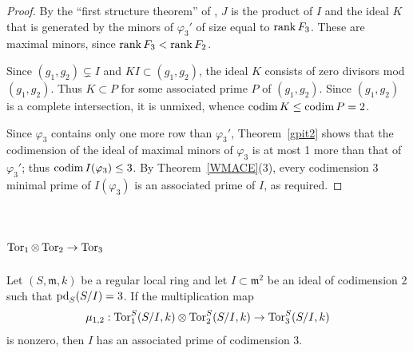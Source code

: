 \documentclass[11pt]{amsart}
\def\phi{{\varphi}}
\def\gm{{\mathfrak m}}
\begin{document}
\begin{proof}
 By the ``first structure theorem'' of \cite[Theorem 3.1]{structure}, $J$ is the product of $I$ and the ideal $K$ that is generated by the
 minors of $\phi_{3}'$ of size equal to $\operatorname{rank} F_{3}$. These are maximal minors, since
 $\operatorname{rank} F_{3}<\operatorname{rank} F_{2}$.

Since $(g_{1}, g_{2})\subsetneq I$ and $KI\subset (g_{1},g_{2})$, the ideal $K$ consists of zero divisors mod $(g_{1},g_{2})$.
Thus $K\subset P$ for some associated prime $P$ of  $(g_{1},g_{2})$. Since $(g_{1},g_{2})$
 is a complete intersection, it is unmixed, whence $\operatorname{codim} K \leq \operatorname{codim} P = 2$.
 
Since $\phi_{3}$ contains only one more row than $\phi_{3}'$, Theorem~\ref{gpit2} shows that the codimension of the ideal of maximal minors of $\phi_{3}$ is at most 1 more than that of $\phi_{3}'$; thus 
$\codim I(\phi_{3})\leq 3$. By Theorem~\ref{WMACE}(3), every codimension 3 minimal prime of $I(\phi_3)$ is an associated prime of $I$, as required.
\end{proof}




\section{\texorpdfstring{$\operatorname{Tor}_1\otimes\operatorname{Tor}_2\to \operatorname{Tor}_3$}{Tor1 tensor Tor2 to Tor3}}
\label{sec:second-mult}

\begin{theorem}
Let $(S, \gm, k)$ be a regular local ring and let $I\subset \gm^{2}$
be an ideal of codimension 2 such that $\operatorname{pd}_S(S/I) = 3$. If the multiplication map
 $$
\mu_{1,2}:  \operatorname{Tor}_1^{S}(S/I,k) \otimes\operatorname{Tor}_2^{S}(S/I,k) \to \operatorname{Tor}_3^{S}(S/I,k)
 $$
 is nonzero, then $I$ has an associated prime of codimension 3.
 \end{theorem}
 
\end{document}

